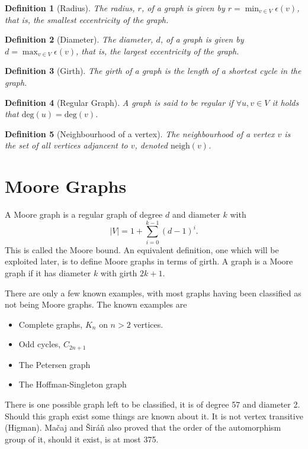 \documentclass[a4paper]{article}
\newtheorem*{definition*}{Definition}
\renewcommand{\deg}[1]{\text{deg}#1}
\newcommand{\neigh}{\text{neigh}}
\begin{document}
\begin{definition*}[Radius]
The radius, $r$, of a graph is given by $r=\min_{v\in V}\epsilon(v)$, that is, the smallest eccentricity of the graph.
\end{definition*}
\begin{definition*}[Diameter]
The diameter, $d$, of a graph is given by $d=\max_{v\in V}\epsilon(v)$, that is, the largest eccentricity of the graph.
\end{definition*}
\begin{definition*}[Girth]
The girth of a graph is the length of a shortest cycle in the graph.
\end{definition*}
\begin{definition*}[Regular Graph]
A graph is said to be regular if $\forall u,v\in V$ it holds that $\deg(u)=\deg(v)$.
\end{definition*}
\begin{definition*}[Neighbourhood of a vertex]
The neighbourhood of a vertex $v$ is the set of all vertices adjancent to $v$, denoted $\neigh(v)$.
\end{definition*}

\section{Moore Graphs}
A Moore graph is a regular graph of degree $d$ and diameter $k$ with $$|V|=1+\sum_{i=0}^{k-1}(d-1)^i.$$ This is called the Moore bound. An equivalent definition, one which will be exploited later, is to define Moore graphs in terms of girth. A graph is a Moore graph if it has diameter $k$ with girth $2k+1$.

There are only a few known examples, with most graphs having been classified as not being Moore graphs. The known examples are
\begin{itemize}
	\item Complete graphs, $K_n$ on $n>2$ vertices.
	\item Odd cycles, $C_{2n+1}$
	\item The Petersen graph
	\item The Hoffman-Singleton graph
\end{itemize}

There is one possible graph left to be classified, it is of degree 57 and diameter 2. Should this graph exist some things are known about it. It is not vertex transitive (Higman). Ma\v caj and \v Sir\'a\v n also proved that the order of the automorphism group of it, should it exist, is at most 375.
\end{document}
